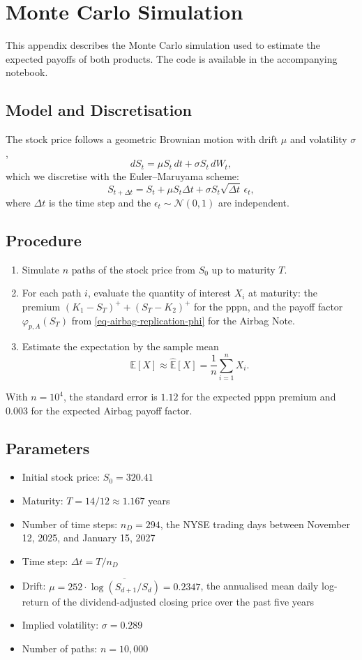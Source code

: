 \section{Monte Carlo Simulation}
\label{appendix-monte-carlo-simulation}

This appendix describes the Monte Carlo simulation used to estimate the expected payoffs of both products.
The code is available in the accompanying notebook.

\subsection{Model and Discretisation}
The stock price follows a geometric Brownian motion with drift $\mu$ and volatility $\sigma$,
\[
    dS_t = \mu S_t\, dt + \sigma S_t\, dW_t,
\]
which we discretise with the Euler--Maruyama scheme:
\[
    S_{t+\Delta t} = S_t + \mu S_t \Delta t + \sigma S_t \sqrt{\Delta t}\,\epsilon_t,
\]
where $\Delta t$ is the time step and the $\epsilon_t \sim \mathcal{N}(0,1)$ are independent.

\subsection{Procedure}
\begin{enumerate}
    \item Simulate $n$ paths of the stock price from $S_0$ up to maturity $T$.
    \item For each path $i$, evaluate the quantity of interest $X_i$ at maturity: the premium $(K_1 - S_T)^+ + (S_T - K_2)^+$ for the \gls{pppn}, and the payoff factor $\varphi_{p,A}(S_T)$ from \eqref{eq-airbag-replication-phi} for the Airbag Note.
    \item Estimate the expectation by the sample mean
    \[
        \mathbb{E}[X] \approx \hat{\mathbb{E}}[X] = \frac{1}{n} \sum_{i=1}^{n} X_{i}.
    \]
\end{enumerate}
With $n = 10^4$, the standard error is $1.12$ for the expected \gls{pppn} premium and $0.003$ for the expected Airbag payoff factor.

\subsection{Parameters}
\begin{itemize}
    \item Initial stock price: $S_0 = 320.41$
    \item Maturity: $T = 14/12 \approx 1.167$ years
    \item Number of time steps: $n_D = 294$, the NYSE trading days between November 12, 2025, and January 15, 2027
    \item Time step: $\Delta t = T / n_D$
    \item Drift: $\mu = 252 \cdot \overline{\log(S_{d+1}/S_d)} = 0.2347$, the annualised mean daily log-return of the dividend-adjusted closing price over the past five years
    \item Implied volatility: $\sigma = 0.289$
    \item Number of paths: $n = 10{,}000$
\end{itemize}
